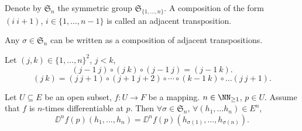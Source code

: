 \begin{definitionenv}
    Denote by $\mathfrak{S}_n$ the symmetric group $\mathfrak{S}_{\{1,\ldots,n\}}$. A composition of the form $(i \ i+1)$, $i\in \{1,\ldots,n-1\}$  is called an adjacent transposition.
\end{definitionenv}
\begin{corollaryenv}
    Any $\sigma\in \mathfrak{S}_n$ can be written as a composition of adjacent transpositions.
\end{corollaryenv}
\begin{proofenv}
    Let $(j,k)\in\{1,\ldots,n\}^2$, $j<k$,
    $$(j-1\ j)\circ(j\ k)\circ (j-1\ j)=(j-1\ k).$$
    $$(j\ k)=(j \ j+1)\circ (j+1\ j+2)\circ \cdots \circ (k-1\ k)\circ\dots (j\ j+1).$$
\end{proofenv}
\begin{theoremenv}[Schwarz]
    Let $U\subseteq E$ be an open subset, $f: U\longrightarrow F$ be a mapping. $n\in \NN_{\ge 1}$, $p\in U$. Assume that $f$ is $n$-times differentiable at $p$. Then $\forall \sigma\in \mathfrak{S}_{n}$, $\forall (h_1,\ldots h_n)\in E^n$,
    $$\DD^n f(p)(h_1,\ldots,h_n)=\DD^n f(p)(h_{\sigma(1)},\ldots,h_{\sigma(n)}).$$
\end{theoremenv}
